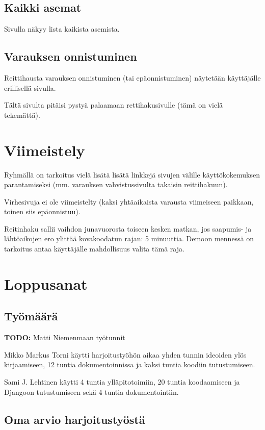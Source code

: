 \documentclass[a4paper,twoside,titlepage,12pt]{article}
\begin{document}
\subsection{Kaikki asemat}
Sivulla näkyy lista kaikista asemista.

\subsection{Varauksen onnistuminen}

Reittihausta varauksen onnistuminen (tai epäonnistuminen) näytetään
käyttäjälle erillisellä sivulla.

Tältä sivulta pitäisi pystyä palaamaan rettihakusivulle (tämä on vielä
tekemättä).

\section{Viimeistely}

Ryhmällä on tarkoitus vielä lisätä lisätä linkkejä sivujen välille
käyttökokemuksen parantamiseksi (mm. varauksen vahvistussivulta takaisin
reittihakuun).

Virhesivuja ei ole viimeistelty (kaksi yhtäaikaista varausta viimeiseen
paikkaan, toinen siis epäonnistuu).

Reitinhaku sallii vaihdon junavuorosta toiseen kesken matkan, jos saapumis- ja
lähtöaikojen ero ylittää kovakoodatun rajan: 5 minuuttia. Demoon mennessä on
tarkoitus antaa käyttäjälle mahdollisuus valita tämä raja.

\section{Loppusanat}
\subsection{Työmäärä}
\textbf{TODO:} Matti Niemenmaan työtunnit

Mikko Markus Torni käytti harjoitustyöhön aikaa yhden tunnin ideoiden ylös kirjaamiseen, 12 tuntia dokumentoinnissa ja kaksi tuntia koodiin tutustumiseen.

Sami J. Lehtinen käytti 4 tuntia ylläpitotoimiin, 20 tuntia koodaamiseen
ja Djangoon tutustumiseen sekä 4 tuntia dokumentointiin.

\subsection{Oma arvio harjoitustyöstä}
\end{document}
